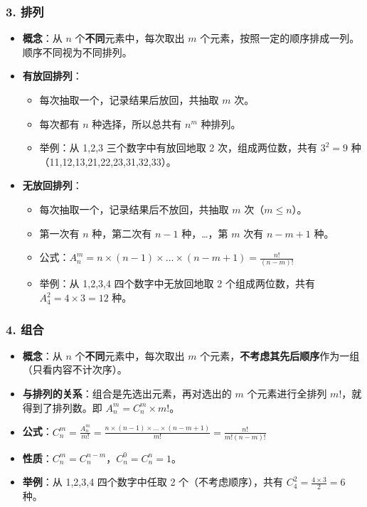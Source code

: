 \documentclass[12pt,a4paper]{ctexart}
\begin{document}
\subsubsection{3. 排列}
\begin{itemize}[noitemsep]
    \item \textbf{概念}：从 $n$ 个\textbf{不同}元素中，每次取出 $m$ 个元素，按照一定的顺序排成一列。顺序不同视为不同排列。
    \item \textbf{有放回排列}：
          \begin{itemize}[noitemsep]
              \item 每次抽取一个，记录结果后放回，共抽取 $m$ 次。
              \item 每次都有 $n$ 种选择，所以总共有 $n^m$ 种排列。
              \item 举例：从 1,2,3 三个数字中有放回地取 2 次，组成两位数，共有 $3^2=9$ 种（11,12,13,21,22,23,31,32,33）。
          \end{itemize}
    \item \textbf{无放回排列}：
          \begin{itemize}[noitemsep]
              \item 每次抽取一个，记录结果后不放回，共抽取 $m$ 次（$m \le n$）。
              \item 第一次有 $n$ 种，第二次有 $n-1$ 种，…，第 $m$ 次有 $n-m+1$ 种。
              \item 公式：$A_n^m = n \times (n-1) \times \dots \times (n-m+1) = \frac{n!}{(n-m)!}$
              \item 举例：从 1,2,3,4 四个数字中无放回地取 2 个组成两位数，共有 $A_4^2 = 4 \times 3 = 12$ 种。
          \end{itemize}
\end{itemize}

\subsubsection{4. 组合}
\begin{itemize}[noitemsep]
    \item \textbf{概念}：从 $n$ 个\textbf{不同}元素中，每次取出 $m$ 个元素，\textbf{不考虑其先后顺序}作为一组（只看内容不计次序）。
    \item \textbf{与排列的关系}：组合是先选出元素，再对选出的 $m$ 个元素进行全排列 $m!$，就得到了排列数。即 $A_n^m = C_n^m \times m!$。
    \item \textbf{公式}：$C_n^m = \frac{A_n^m}{m!} = \frac{n \times (n-1) \times \dots \times (n-m+1)}{m!} = \frac{n!}{m!(n-m)!}$
    \item \textbf{性质}：$C_n^m = C_n^{n-m}$，$C_n^0 = C_n^n = 1$。
    \item \textbf{举例}：从 1,2,3,4 四个数字中任取 2 个（不考虑顺序），共有 $C_4^2 = \frac{4 \times 3}{2} = 6$ 种。
\end{itemize}
\end{document}
